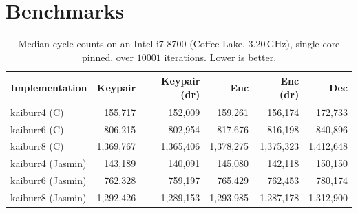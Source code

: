 \documentclass[a4paper,runningheads]{llncs}
\newif\ifpublic
\begin{document}
\section{Benchmarks}
\label{sec:benchmarks}

\begin{table}[ht]
\centering
\caption{Median cycle counts on an Intel i7-8700 (Coffee Lake, 3.20\,GHz), single core pinned, over $10001$ iterations. Lower is better.}
\label{tab:bench-8700k}
\begin{tabular}{l r r r r r}
\hline
Implementation & Keypair & Keypair (dr) & Enc & Enc (dr) & Dec \\
\hline
\textsf{kaiburr4} (C)      &   155{,}717 &   152{,}009 &   159{,}261 &   156{,}174 &   172{,}733 \\
\textsf{kaiburr6} (C)      &   806{,}215 &   802{,}954 &   817{,}676 &   816{,}198 &   840{,}896 \\
\textsf{kaiburr8} (C)      & 1{,}369{,}767 & 1{,}365{,}406 & 1{,}378{,}275 & 1{,}375{,}323 & 1{,}412{,}648 \\
\hline
\textsf{kaiburr4} (Jasmin) &   143{,}189 &   140{,}091 &   145{,}080 &   142{,}118 &   150{,}150 \\
\textsf{kaiburr6} (Jasmin) &   762{,}328 &   759{,}197 &   765{,}429 &   762{,}453 &   780{,}174 \\
\textsf{kaiburr8} (Jasmin) & 1{,}292{,}426 & 1{,}289{,}153 & 1{,}293{,}985 & 1{,}287{,}178 & 1{,}312{,}900 \\
\hline
\end{tabular}
\end{table}

\ifpublic
\section*{Acknowledgements}
Large parts of the work were done while the first author was employed at MPI-SP.
\fi



\end{document}

